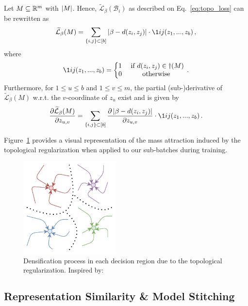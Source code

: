 \documentclass[../main.tex]{subfiles}
\begin{document}
\begin{theorem}
Let ${M \subseteq \mathbb{R}^m}$ with $\left\lvert M \right\rvert$. Hence, $\widetilde{\mathcal{L}}_\beta(\mathcal{B}_i)$ as described on Eq.~\ref{eq:topo_loss} can be rewritten as
\[
\widetilde{\mathcal{L}}_\beta(M) = \sum_{\{i,j\} \subset [b]} \abs{\beta - d(z_i, z_j)} \cdot \1{i}{j}(z_1, ..., z_b)\,,
\]
where
\[
\1{i}{j}(z_1, ..., z_b) = \left\{\begin{matrix}
1 & \text{ if } d(z_i, z_j) \in \dag(M)\\
0 & \text{ otherwise } \\
\end{matrix}\right.\,.
\]
Furthermore, for $1\leq u \leq b$ and $1 \leq v \leq m$, the partial (sub-)derivative of  $\widetilde{\mathcal{L}}_\beta(M)$ w.r.t. the $v$-coordinate of $z_u$ exist and is given by
\[
\frac{\partial \widetilde{\mathcal{L}}_\beta(M)}{\partial z_{u,v}} = \sum_{\{i,j\} \subset [b]} \frac{\partial \abs{\beta - d(z_i, z_j)}}{\partial z_{u,v}} \cdot \1{i}{j}(z_1, ..., z_b)\,.
\]
\end{theorem}


Figure~\ref{fig:attrac} provides a visual representation of the mass attraction induced by the topological regularization when applied to our sub-batches during training.

\begin{figure}[!ht]
    \centering
    \includegraphics[width=0.45\textwidth]{figures/bg/atractor.pdf} 
    \caption{Densification process in each decision region due to the topological regularization. Inspired by: \cite{torres_hopfield_2019}}
    \label{fig:attrac}
\end{figure}

\subsection{Representation Similarity \& Model Stitching}
\label{sec:repLearn}
\end{document}
